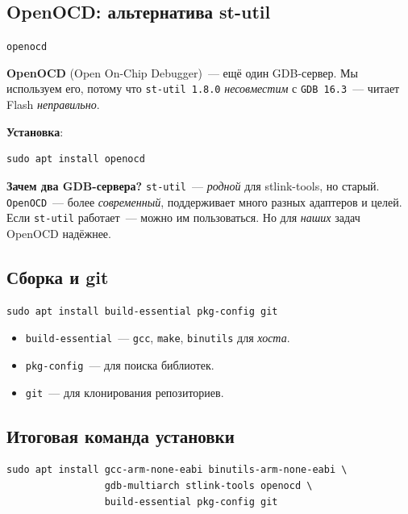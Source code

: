 \subsection{OpenOCD: альтернатива st-util}

\begin{center}
\texttt{openocd}
\end{center}

\textbf{OpenOCD} (Open On-Chip Debugger)~--- ещё один
GDB-сервер. Мы используем его, потому что \texttt{st-util 1.8.0}
\emph{несовместим} с \texttt{GDB 16.3}~--- читает Flash
\emph{неправильно}.

\textbf{Установка}:

\begin{verbatim}
sudo apt install openocd
\end{verbatim}

\begin{notebox}
\textbf{Зачем два GDB-сервера?} \texttt{st-util}~---
\emph{родной} для stlink-tools, но старый. \texttt{OpenOCD}~---
более \emph{современный}, поддерживает много разных
адаптеров и целей. Если \texttt{st-util} работает~---
можно им пользоваться. Но для \emph{наших} задач
OpenOCD надёжнее.
\end{notebox}

\subsection{Сборка и git}

\begin{verbatim}
sudo apt install build-essential pkg-config git
\end{verbatim}

\begin{itemize}
    \item \texttt{build-essential}~--- \texttt{gcc}, \texttt{make},
          \texttt{binutils} для \emph{хоста}.
    \item \texttt{pkg-config}~--- для поиска библиотек.
    \item \texttt{git}~--- для клонирования репозиториев.
\end{itemize}

\subsection{Итоговая команда установки}

\begin{verbatim}
sudo apt install gcc-arm-none-eabi binutils-arm-none-eabi \
                 gdb-multiarch stlink-tools openocd \
                 build-essential pkg-config git
\end{verbatim}

